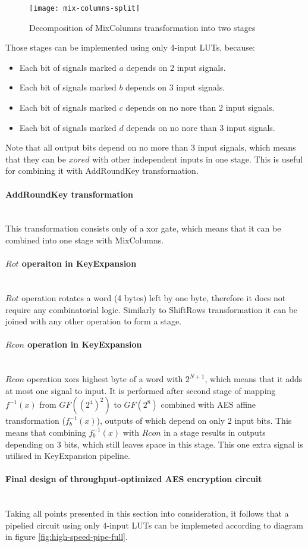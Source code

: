 \begin{figure}[!h]
\centering
\texttt{[image: mix-columns-split]}
\caption{Decomposition of MixColumns transformation into two stages}
\label{fig:mix-columns-split}
\end{figure}

Those stages can be implemented using only 4-input LUTs, because:
\begin{itemize}[nolistsep]
\item Each bit of signals marked $a$ depends on 2 input signals.
\item Each bit of signals marked $b$ depends on 3 input signals.
\item Each bit of signals marked $c$ depends on no nore than 2 input signals.
\item Each bit of signals marked $d$ depends on no nore than 3 input signals.
\end{itemize}

Note that all output bits depend on no more than 3 input signals, which means that they can be $xored$ with other independent inputs in one stage. This is useful for combining it with AddRoundKey transformation.


\paragraph{AddRoundKey transformation}\mbox{}\\
This transformation consists only of a xor gate, which means that it can be combined into one stage with MixColumns.


\paragraph{$Rot$ operaiton in KeyExpansion}\mbox{}\\
$Rot$ operation rotates a word (4 bytes) left by one byte, therefore it does not require any combinatorial logic. Similarly to ShiftRows transformation it can be joined with any other operation to form a stage.

\paragraph{$Rcon$ operation in KeyExpansion}\mbox{}\\
$Rcon$ operation xors highest byte of a word with $2^{N + 1}$, which means that it adds at most one signal to input. It is performed after second stage of mapping $f^{-1}(x)$ from $GF((2^4)^2)$ to $GF(2^8)$ combined with AES affine transformation ($f_b^{-1}(x)$), outputs of which depend on only 2 input bits. This means that combining $f_b^{-1}(x)$ with $Rcon$ in a stage results in outputs depending on 3 bits, which still leaves space in this stage. This one extra signal is utilised in KeyExpansion pipeline.

\paragraph{Final design of throughput-optimized AES encryption circuit}\mbox{}\\
Taking all points presented in this section into consideration, it follows that a pipelied circuit using only 4-input LUTs can be implemeted according to diagram in figure \ref{fig:high-speed-pipe-full}.



